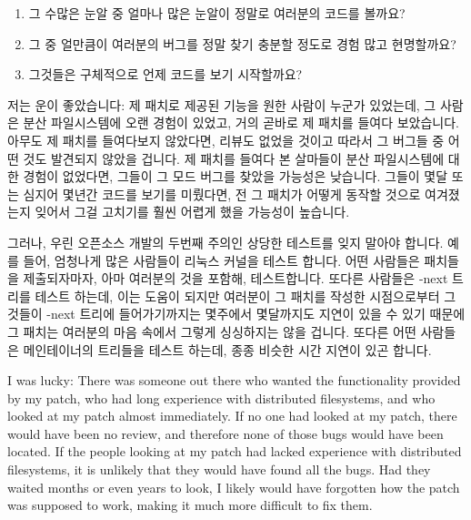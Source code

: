 \begin{enumerate}
\item	그 수많은 눈알 중 얼마나 많은 눈알이 정말로 여러분의 코드를 볼까요?
\item	그 중 얼만큼이 여러분의 버그를 정말 찾기 충분할 정도로 경험 많고
	현명할까요?
\item	그것들은 구체적으로 언제 코드를 보기 시작할까요?

\end{enumerate}

저는 운이 좋았습니다:  제 패치로 제공된 기능을 원한 사람이 누군가 있었는데, 그
사람은 분산 파일시스템에 오랜 경험이 있었고, 거의 곧바로 제 패치를 들여다
보았습니다.
아무도 제 패치를 들여다보지 않았다면, 리뷰도 없었을 것이고 따라서 그 버그들 중
어떤 것도 발견되지 않았을 겁니다.
제 패치를 들여다 본 살마들이 분산 파일시스템에 대한 경험이 없었다면, 그들이 그
모드 버그를 찾았을 가능성은 낮습니다.
그들이 몇달 또는 심지어 몇년간 코드를 보기를 미뤘다면, 전 그 패치가 어떻게
동작할 것으로 여겨졌는지 잊어서 그걸 고치기를 훨씬 어렵게 했을 가능성이
높습니다.

그러나, 우린 오픈소스 개발의 두번째 주의인 상당한 테스트를 잊지 말아야 합니다.
예를 들어, 엄청나게 많은 사람들이 리눅스 커널을 테스트 합니다.
어떤 사람들은 패치들을 제출되자마자, 아마 여러분의 것을 포함해, 테스트합니다.
또다른 사람들은 -next 트리를 테스트 하는데, 이는 도움이 되지만 여러분이 그
패치를 작성한 시점으로부터 그것들이 -next 트리에 들어가기까지는 몇주에서
몇달까지도 지연이 있을 수 있기 때문에 그 패치는 여러분의 마음 속에서 그렇게
싱싱하지는 않을 겁니다.
또다른 어떤 사람들은 메인테이너의 트리들을 테스트 하는데, 종종 비슷한 시간
지연이 있곤 합니다.

\iffalse

I was lucky:  There was someone out there who wanted the functionality
provided by my patch, who had long experience with distributed filesystems,
and who looked at my patch almost immediately.
If no one had looked at my patch, there would have been no review, and
therefore none of those bugs would have been located.
If the people looking at my patch had lacked experience with distributed
filesystems, it is unlikely that they would have found all the bugs.
Had they waited months or even years to look, I likely would have forgotten
how the patch was supposed to work, making it much more difficult to
fix them.

